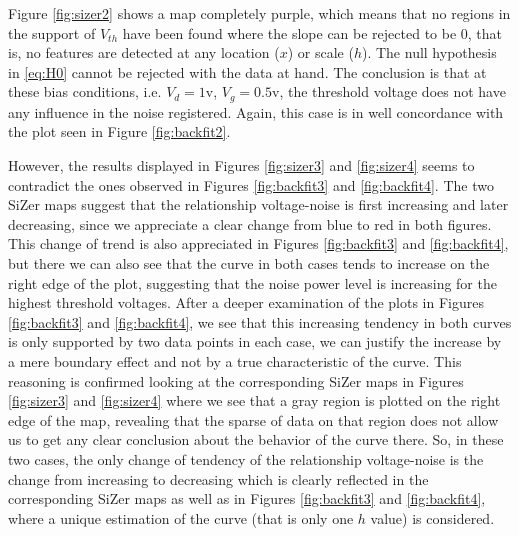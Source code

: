 \documentclass[sn-mathphys]{sn-jnl}%
\theoremstyle{thmstyleone}%
\theoremstyle{thmstyletwo}%
\theoremstyle{thmstylethree}%
\begin{document}
Figure \ref{fig:sizer2} shows a map completely purple, which means that no regions in the support of $V_{th}$ have been found where the slope can be rejected to be 0, that is, no features are detected at any location ($x$) or scale ($h$). The null hypothesis in \eqref{eq:H0} cannot be rejected with the data at hand. The conclusion is that at these bias conditions, i.e. $V_d=1$v, $V_g=0.5$v, the threshold voltage does not have any influence in the noise registered. Again, this case is in well concordance with the plot seen in Figure \ref{fig:backfit2}.

However, the results displayed in Figures  \ref{fig:sizer3} and \ref{fig:sizer4} seems to contradict the ones observed in Figures \ref{fig:backfit3} and \ref{fig:backfit4}. The two SiZer maps suggest that the relationship voltage-noise is first increasing and later decreasing, since we appreciate a clear change from blue to red in both figures. This change of trend is also appreciated in Figures \ref{fig:backfit3} and \ref{fig:backfit4}, but there we can also see that the curve in both cases tends to increase on the right edge of the plot, suggesting that the noise power level is increasing for the highest threshold voltages. After a deeper examination of the plots in Figures \ref{fig:backfit3} and \ref{fig:backfit4},  we see that this increasing tendency in both curves is only supported by two data points in each case, we can justify the increase by a mere boundary effect and not by a true characteristic of the curve. This reasoning is confirmed looking at the corresponding SiZer maps in  Figures  \ref{fig:sizer3} and \ref{fig:sizer4} where we see that a gray region is plotted on the right edge of the map, revealing that the sparse of data on that region does not allow us to get any clear conclusion about the behavior of the curve there. So, in these two cases, the only change of tendency of the relationship voltage-noise is the change from  increasing to decreasing which is clearly reflected in the corresponding SiZer maps as well as in Figures \ref{fig:backfit3} and \ref{fig:backfit4}, where a unique estimation of the curve (that is only one $h$ value) is considered.
\end{document}
